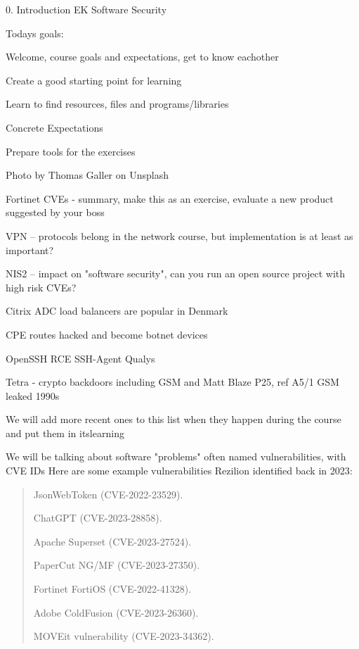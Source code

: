 \documentclass[Screen16to9,17pt]{foils}
\begin{document}
\mytitlepage
{0. Introduction}
{EK Software Security}

\hlkprofiluk



Todays goals:
\begin{list2}
\item Welcome, course goals and expectations, get to know eachother
\item Create a good starting point for learning
\item Learn to find resources, files and programs/libraries
\item Concrete Expectations
\item Prepare tools for the exercises
\end{list2}

  Photo by Thomas Galler on Unsplash


\begin{list2}
\item Fortinet CVEs - summary, make this as an exercise, evaluate a new product suggested by your boss
\item VPN -- protocols belong in the network course, but implementation is at least as important?
\item NIS2 -- impact on "software security", can you run an open source project with high risk CVEs?
\item Citrix ADC load balancers are popular in Denmark
\item CPE routes hacked and become botnet devices
\item OpenSSH RCE SSH-Agent Qualys
\item Tetra - crypto backdoors including GSM and Matt Blaze P25, ref A5/1 GSM leaked 1990s
\end{list2}

We will add more recent ones to this list when they happen during the course and put them in itslearning


We will be talking about software "problems" often named vulnerabilities, with CVE IDs
Here are some example vulnerabilities Rezilion identified back in 2023:
\begin{quote}
\begin{list2}
\item JsonWebToken (CVE-2022-23529).
\item ChatGPT (CVE-2023-28858).
\item Apache Superset (CVE-2023-27524).
\item PaperCut NG/MF (CVE-2023-27350).
\item Fortinet FortiOS (CVE-2022-41328).
\item Adobe ColdFusion (CVE-2023-26360).
\item MOVEit vulnerability (CVE-2023-34362).
\end{list2}
\end{quote}
\end{document}
